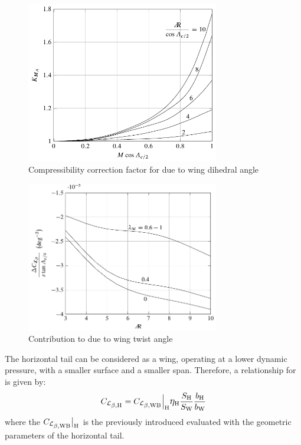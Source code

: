 \begin{figure}[htbp]
\centering
\includegraphics[width=0.75\textwidth]{Immagini/Capitolo2/4_44-K_Roll_M_Gam}
\caption[Compressibility correction factor for \CLbetaWB due to \GammaW] {Compressibility correction factor for \CLbetaWB due to wing dihedral angle}
\label{compressibilitycorrectiondihedral}
\end{figure}

\begin{figure}[htbp]
\centering
\includegraphics[width=0.75\textwidth]{Immagini/Capitolo2/4_46-K_Roll_Cl_Lam_twist}
\caption[Contribution to \CLbetaWB due to \epsW] {Contribution to \CLbetaWB due to wing twist angle}
\label{twistanglecontribution}
\end{figure}

The horizontal tail can be considered as a wing, operating at a lower dynamic pressure, with a smaller surface and a smaller span. Therefore, a relationship for \CLbetaH is given by:
\begin{equation}
\label{eq:dihedralH}
\CLbetaH = \CLbetaWB \Big|_{\mathrm H} \etaH \frac{\SH}{\SW} \frac{\bH}{\bW}
\end{equation}
where the $\CLbetaWB \big|_{\mathrm H}$ is the previously introduced \CLbetaWB evaluated with the geometric parameters of the horizontal tail. 

